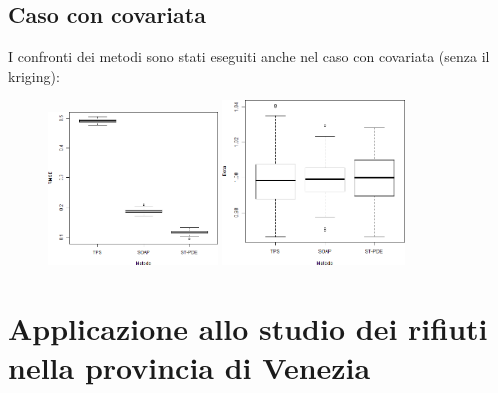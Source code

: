 \documentclass[landscape,9pt]{beamer}                           %
\begin{document}
\subsection{Caso con covariata}
\begin{frame}
I confronti dei metodi sono stati eseguiti anche nel caso con covariata (senza il kriging):
\par\bigskip
\begin{figure}[h]
	\centering
		\subfigure
   		{
		\includegraphics[width=0.40\textwidth]{Immagini/Confronto_metodi_covar.png}   
   		}
	\subfigure
   		{
		\includegraphics[width=0.43\textwidth]{Immagini/Confronto_metodi_beta.png}
   		}
\end{figure}
\end{frame}

\section{Applicazione allo studio dei rifiuti nella provincia di Venezia}
\end{document}
